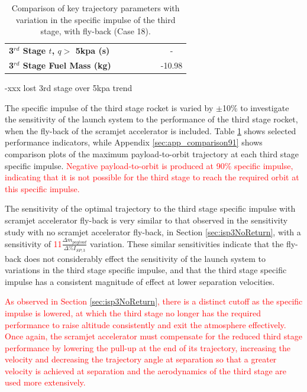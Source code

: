 \begin{table}[ht]
\begin{tabular}{l c c c c c c}
		\textbf{3$^{rd}$ Stage $t$, $q >$ 5kpa (s)}
		& \thirdqOverFiveISPThreeNinety
		& \thirdqOverFiveISPThreeNinetyFive
		& \thirdqOverFiveISPThreeStandard
		& \thirdqOverFiveISPThreeOneHundredFive
		& \thirdqOverFiveISPThreeOneHundredTen
		& -
		\\
		\textbf{3$^{rd}$ Stage Fuel Mass (kg)}
		& \thirdmFuelISPThreeNinety
		& \thirdmFuelISPThreeNinetyFive
		& \thirdmFuelISPThreeStandard
		& \thirdmFuelISPThreeOneHundredFive
		& \thirdmFuelISPThreeOneHundredTen
		&-10.98
		\\
		\hline 
	\end{tabular} 
	\caption{Comparison of key trajectory parameters with variation in the specific impulse of the third stage, with fly-back (Case 18).}
	\label{tab:isp3}
\end{table}
-xxx lost 3rd stage over 5kpa trend

The specific impulse of the third stage rocket is varied by $\pm$10\% to investigate the sensitivity of the launch system to the performance of the third stage rocket, when the fly-back of the scramjet accelerator is included. 
Table \ref{tab:isp3} shows selected performance indicators, while Appendix \ref{sec:app_comparison91} shows comparison plots of the maximum payload-to-orbit trajectory at each third stage specific impulse. \textcolor{red}{Negative payload-to-orbit is produced at 90\% specific impulse, indicating that it is not possible for the third stage to reach the required orbit at this specific impulse. }

The sensitivity of the optimal trajectory to the third stage specific impulse with scramjet accelerator fly-back is very similar to that observed in the sensitivity study with no scramjet accelerator fly-back, in Section \ref{sec:isp3NoReturn}, with a sensitivity of \textcolor{red}{11}$\frac{\Delta m_{payload}}{\Delta\%I_{SP,3}}$ variation. 
These similar sensitivities indicate that the fly-back does not considerably effect the sensitivity of the launch system to variations in the third stage specific impulse, and that the third stage specific impulse has a consistent magnitude of effect at lower separation velocities. 

\textcolor{red}{As observed in Section \ref{sec:isp3NoReturn}, there is a distinct cutoff as the specific impulse is lowered, at which the third stage no longer has the required performance to raise altitude consistently and exit the atmosphere effectively. Once again, the scramjet accelerator must compensate for the reduced third stage performance by lowering the pull-up at the end of its trajectory, increasing the velocity and decreasing the trajectory angle at separation so that a greater velocity is achieved at separation and the aerodynamics of the third stage are used more extensively.} 






